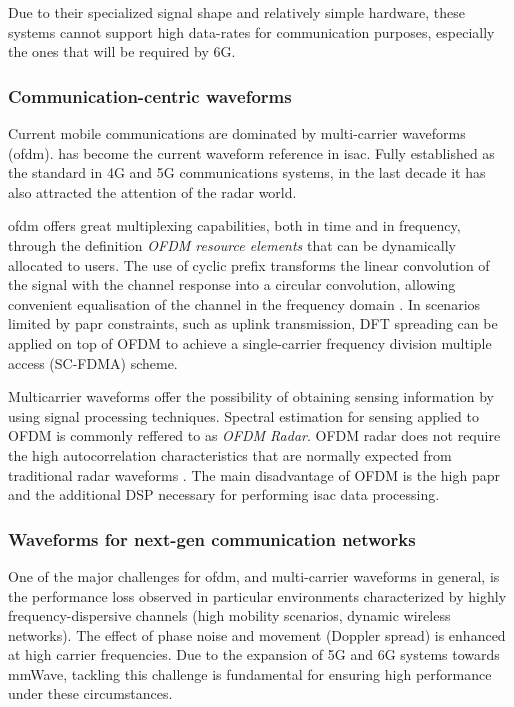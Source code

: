 	Due to their specialized signal shape and relatively simple hardware, these systems cannot support high data-rates for communication purposes, especially the ones that will be required by 6G.
	
	\subsubsection{Communication-centric waveforms}
	
	Current mobile communications are dominated by multi-carrier waveforms (\gls{ofdm}).
	 has become the current waveform reference in \gls{isac}. Fully established as the standard in 4G and 5G communications systems, in the last decade it has also attracted the attention of the radar world.
	
	\gls{ofdm} offers great multiplexing capabilities, both in time and in frequency, through the definition \textit{OFDM resource elements} that can be dynamically allocated to users. The use of cyclic prefix transforms the linear convolution of the signal with the channel response into a circular convolution, allowing convenient equalisation of the channel in the frequency domain \cite{Wild_Grudnitsky_Mandelli_Henninger_Guan_Schaich_2023}. In scenarios limited by \gls{papr} constraints, such as uplink transmission, DFT spreading can  be applied on top of OFDM to achieve a single-carrier frequency division multiple access (SC-FDMA) scheme.
	
	\alert{Multicarrier waveforms offer the possibility of obtaining sensing information by using signal processing techniques. Spectral estimation for sensing applied to OFDM is commonly reffered to as \textit{OFDM Radar}.}
	OFDM radar does not require the high autocorrelation characteristics that are normally expected from traditional radar waveforms \cite{Sturm_Wiesbeck_2011}.
	The main disadvantage of OFDM is the high \gls{papr} and the additional \alert{DSP} necessary for performing \gls{isac} data processing.
	
	\subsubsection{Waveforms for next-gen communication networks}
	
	One of the major challenges for \gls{ofdm}, and multi-carrier waveforms in general, is the performance loss observed in particular environments characterized by highly frequency-dispersive channels (\eg high mobility scenarios, dynamic wireless networks).
	The effect of phase noise and movement (Doppler spread) is enhanced at high carrier frequencies. 
	Due to the expansion of 5G and 6G systems towards mmWave, tackling this challenge is fundamental for ensuring high performance under these circumstances.
	
